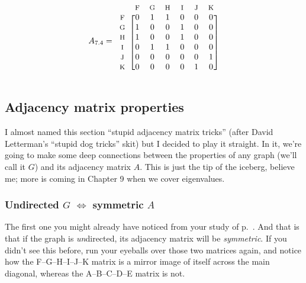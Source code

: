 \[
A_{7.4} = 
\begin{blockarray}{ccccccc}
& {\footnotesize\textrm{F}} & {\footnotesize\textrm{G}} & {\footnotesize\textrm{H}} & {\footnotesize\textrm{I}} & {\footnotesize\textrm{J}} & {\footnotesize\textrm{K}} \\
\begin{block}{c[cccccc]}
{\footnotesize\textrm{F}} & 0 & 1 & 1 & 0 & 0 & 0 \\
{\footnotesize\textrm{G}} & 1 & 0 & 0 & 1 & 0 & 0 \\
{\footnotesize\textrm{H}} & 1 & 0 & 0 & 1 & 0 & 0 \\
{\footnotesize\textrm{I}} & 0 & 1 & 1 & 0 & 0 & 0 \\
{\footnotesize\textrm{J}} & 0 & 0 & 0 & 0 & 0 & 1 \\
{\footnotesize\textrm{K}} & 0 & 0 & 0 & 0 & 1 & 0 \\
\end{block}
\end{blockarray}
\]


\subsection{Adjacency matrix properties}


I almost named this section ``stupid adjacency matrix tricks'' (after David
Letterman's ``stupid dog tricks'' skit) but I decided to play it straight. In
it, we're going to make some deep connections between the properties of any
graph (we'll call it $G$) and its adjacency matrix $A$. This is just the tip of
the iceberg, believe me; more is coming in Chapter 9 when we cover eigenvalues.

\subsubsection{Undirected $G$ $\Leftrightarrow$ symmetric $A$}


The first one you might already have noticed from your study of
p.~\pageref{firstAdjacencyMatrix}. And that is that if the graph is
\textit{un}directed, its adjacency matrix will be \textit{symmetric}. If you
didn't see this before, run your eyeballs over those two matrices again, and
notice how the F--G--H--I--J--K matrix is a mirror image of itself across the
main diagonal, whereas the A--B--C--D--E matrix is not.

